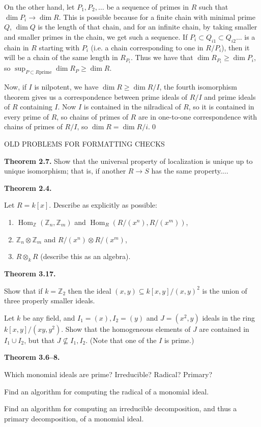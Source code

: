 \documentclass[Letter,12pt]{article}
\newcommand{\problem}[2]{
	\vspace{0.3in} 
	\begin{leftbar} 
		\noindent \textbf{{#1}.} {#2} 
\end{leftbar} }
\renewenvironment{leftbar}{%
	\def\FrameCommand{\vrule width 1pt \relax\hspace {5pt}}
	\MakeFramed {\advance \hsize -\width \FrameRestore }
}{
	\endMakeFramed
}
\newcommand{\z}{\mathbb{Z}}
\newcommand{\<}{\left\langle}
\renewcommand{\>}{\right\rangle}
\DeclareMathOperator{\Hom}{Hom}
\renewcommand{\hom}[1]{\Hom_{{#1}}}
\renewcommand{\ss}{\subseteq}
\theoremstyle{definition}
\begin{document}
	On the other hand, let $P_1,P_2,\ldots$ be a sequence of primes in $R$ such that $\dim P_i\to\dim R$. This is possible because for a finite chain with minimal prime $Q$, $\dim Q$ is the length of that chain, and for an infinite chain, by taking smaller and smaller primes in the chain, we get such a sequence. If $P_i\subset Q_{i1}\subset Q_{i2}\ldots$ is a chain in $R$ starting with $P_i$ (i.e. a chain corresponding to one in $R/P_i$), then it will be a chain of the same length in $R_{P_i}$. Thus we have that $\dim R_{P_i}\ge \dim P_i$, so $\sup_{P\subset R \text{prime}} \dim R_P\ge \dim R$.
	
	Now, if $I$ is nilpotent, we have $\dim R\ge \dim R/I$, the fourth isomorphism theorem gives us a correspondence between prime ideals of $R/I$ and prime ideals of $R$ containing $I$. Now $I$ is contained in the nilradical of $R$, so it is contained in every prime of $R$, so chains of primes of $R$ are in one-to-one correspondence with chains of primes of $R/I$, so $\dim R = \dim R/i$.\qed
	
	
	OLD PROBLEMS FOR FORMATTING CHECKS
	
	
	\problem{Theorem 2.7}{
		Show that the universal property of localization is unique up to unique isomorphism; that is, if another $R\to S$ has the same property....
	}
	
	
	\problem{Theorem 2.4}{
		Let $R=k[x]$. Describe as explicitly as possible:
		\begin{enumerate}
			\item $\hom{\z}(\z_n,\z_m)$ and $\hom{R}(R/(x^n), R/(x^m))$,
			\item $\z_n\otimes \z_m$ and $R/(x^n)\otimes R/(x^m)$,
			\item $R\otimes_k R$ (describe this as an algebra).
		\end{enumerate}
	}
	
	
	\problem{Theorem 3.17}{
		Show that if $k=\z_2$ then the ideal $(x,y)\ss k[x,y]/(x,y)^2$ is the union of three properly smaller ideals.
		
		Let $k$ be any field, and $I_1=(x), I_2=(y)$ and $J=(x^2,y)$ ideals in the ring $k[x,y]/(xy,y^2)$. Show that the homogeneous elements of $J$ are contained in $I_1\cup I_2$, but that $J\not\ss I_1,I_2$. (Note that one of the $I$ is prime.)
	}
	
	
	\problem{Theorem 3.6--8}{
		Which monomial ideals are prime? Irreducible? Radical? Primary?
		
		Find an algorithm for computing the radical of a monomial ideal.
		
		Find an algorithm for computing an irreducible decomposition, and thus a primary decomposition, of a monomial ideal.
	}
	
\end{document}

